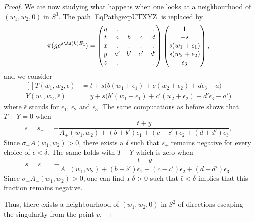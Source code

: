 \begin{proof}
		We are now studying what happens when one looks at a neighbourhood of $(w_1,w_2,0)$ in $S^3$. The path \eqref{EqPathgexpUTXYZ} is replaced by
		\begin{equation}
			\pi(g e^{s\Ad(k)E_1})=
			\begin{pmatrix}
				u & .  & .  & .  & .  \\
				t & a  & b  & c  & d  \\
				x & .  & .  & .  & .  \\
				y & a' & b' & c' & d' \\
				z & .  & .  & .  & .
			\end{pmatrix}
			\begin{pmatrix}
				1                 \\
				-s                \\
				s(w_1+\epsilon_1) \\
				s(w_2+\epsilon_2) \\
				\epsilon_3
			\end{pmatrix},
		\end{equation}
		and we consider
		\begin{equation}
			\begin{aligned}[]
				T(w_1,w_2,\bar\epsilon) & =t+s\big( b(w_1+\epsilon_1)+c(w_2+\epsilon_2)+d\epsilon_3-a \big)     \\
				Y(w_1,w_2,\bar\epsilon) & =y+s\big( b'(w_1+\epsilon_1)+c'(w_2+\epsilon_2)+d'\epsilon_3-a' \big)
			\end{aligned}
		\end{equation}
		where $\bar\epsilon$ stands for $\epsilon_1$, $\epsilon_2$ and $\epsilon_3$. The same computations as before shows that $T+Y=0$ when
		\begin{equation}
			s=s_+=-\frac{ t+y }{ A_+(w_1,w_2)+(b+b')\epsilon_1+(c+c')\epsilon_2+(d+d')\epsilon_3 },
		\end{equation}
		Since $\sigma_+A(w_1,w_2)>0$, there exists a $\delta$ such that $s_+$ remains negative for every choice of $\bar\epsilon<\delta$. The same holds with $T-Y$ which is zero when
		\begin{equation}
			s=s_-=-\frac{ t-y }{ A_-(w_1,w_2)+(b-b')\epsilon_1+(c-c')\epsilon_2 +(d-d')\epsilon_3 }.
		\end{equation}
		Since $\sigma_-A_-(w_1,w_2)>0$, one can find a $\delta>0$ such that $\bar\epsilon<\delta$ implies that this fraction remains negative.

		Thus, there exists a neighbourhood of $(w_1,w_2,0)$ in $S^2$ of directions escaping the singularity from the point $v$.
	\end{proof}


